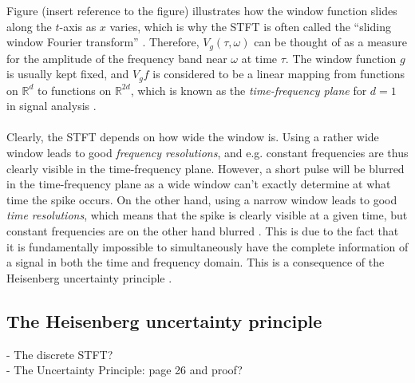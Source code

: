 Figure (insert reference to the figure) illustrates how the window function slides along the $t$-axis as $x$ varies, which is why the STFT is often called the ``sliding window Fourier transform'' . Therefore, $V_g(\tau,\omega)$ can be thought of as a measure for the amplitude of the frequency band near $\omega$ at time $\tau$. The window function $g$ is usually kept fixed, and $V_gf$ is considered to be a linear mapping from functions on $\mathbb{R}^d$ to functions on $\mathbb{R}^{2d}$, which is known as the \textit{time-frequency plane} for $d=1$ in signal analysis \cite{page 38, FTFA}.
\\ \\
Clearly, the STFT depends on how wide the window is. Using a rather wide window leads to good \textit{frequency resolutions}, and e.g. constant frequencies are thus clearly visible in the time-frequency plane. However, a short pulse will be blurred in the time-frequency plane as a wide window can't exactly determine at what time the spike occurs. On the other hand, using a narrow window leads to good \textit{time resolutions}, which means that the spike is clearly visible at a given time, but constant frequencies are on the other hand blurred \cite{Davis}. This is due to the fact that it is fundamentally impossible to simultaneously have the complete information of a signal in both the time and frequency domain. This is a consequence of the Heisenberg uncertainty principle \cite{Wang}.

\subsection{The Heisenberg uncertainty principle}



- The discrete STFT? \\
- The Uncertainty Principle: page 26 and proof?